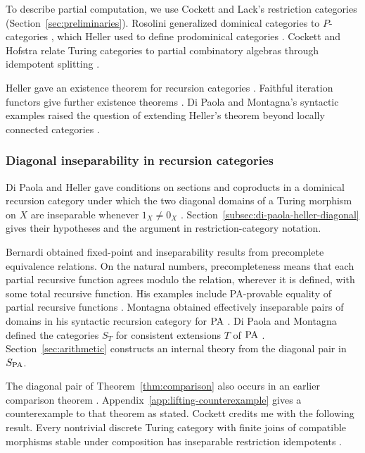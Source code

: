 To describe partial computation, we use Cockett and Lack's restriction
categories \cite{CockettLack} (Section~\ref{sec:preliminaries}).
Rosolini generalized dominical categories to $P$-categories
\cite{RosoliniThesis,Rosolini}, which Heller used to define prodominical
categories \cite[Section~5]{Heller}.
Cockett and Hofstra relate Turing categories to partial combinatory
algebras through idempotent splitting \cite[Theorem~4.9]{CockettHofstra}.

Heller gave an existence theorem for recursion categories
\cite[Sections~8--9]{Heller}. Faithful iteration functors give
further existence theorems \cite{Lengyel2004,Corrections}.
Di Paola and Montagna's syntactic examples raised the question of
extending Heller's theorem beyond locally connected categories \cite{DPM}.

\subsubsection{Diagonal inseparability in recursion categories}

Di Paola and Heller gave conditions on sections and coproducts in a
dominical recursion category under which the two diagonal domains of
a Turing morphism on $X$ are inseparable whenever $1_X\ne0_X$
\cite[pp.~621, 625--626, Theorem~8.15]{DPH}.
Section~\ref{subsec:di-paola-heller-diagonal} gives their hypotheses
and the argument in restriction-category notation.

Bernardi obtained fixed-point and inseparability results from precomplete
equivalence relations. On the natural numbers, precompleteness means
that each partial recursive function agrees modulo the relation, wherever
it is defined, with some total recursive function. His examples include
PA-provable equality of
partial recursive functions \cite[Sections~2--3, pp.~125--128]{Bernardi}.
Montagna obtained effectively inseparable pairs of domains in his
syntactic recursion category for $\mathrm{PA}$
\cite[pp.~105--108 and Remark~3.1]{Montagna}. Di Paola and Montagna
defined the categories $S_T$ for consistent extensions $T$ of $\mathrm{PA}$
\cite[p.~646]{DPM}. Section~\ref{sec:arithmetic} constructs an
internal theory from the diagonal pair in $S_{\mathrm{PA}}$.

The diagonal pair of Theorem~\ref{thm:comparison} also occurs in
an earlier comparison theorem \cite[Theorem~4.1]{Lengyel2006}.
Appendix~\ref{app:lifting-counterexample} gives a counterexample to
that theorem as stated. Cockett credits me with the following result.
Every nontrivial discrete Turing category with finite joins of compatible
morphisms stable under composition has inseparable restriction
idempotents \cite[Sections~5.3 and 7.1, Theorem~7.8]{CockettComputability}.

